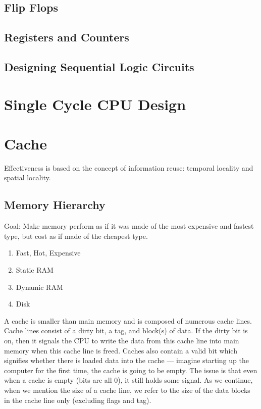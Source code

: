 \documentclass[11pt]{article}
\begin{document}
\subsection{Flip Flops}

\subsection{Registers and Counters}

\subsection{Designing Sequential Logic Circuits}

\section{Single Cycle CPU Design}

\section{Cache}

Effectiveness is based on the concept of information reuse: temporal locality and spatial locality.

\subsection{Memory Hierarchy}

Goal: Make memory perform as if it was made of the most expensive and fastest type, but cost as if made of the cheapest type.

\begin{enumerate}
	\item Fast, Hot, Expensive
	\item Static RAM
	\item Dynamic RAM
	\item Disk
\end{enumerate}

\noindent A cache is smaller than main memory and is composed of numerous cache lines. Cache lines consist of a dirty bit, a tag, and block(s) of data. If the dirty bit is on, then it signals the CPU to write the data from this cache line into main memory when this cache line is freed. Caches also contain a valid bit which signifies whether there is loaded data into the cache --- imagine starting up the computer for the first time, the cache is going to be empty. The issue is that even when a cache is empty (bits are all 0), it still holds some signal. As we continue, when we mention the size of a cache line, we refer to the size of the data blocks in the cache line only (excluding flags and tag).
\end{document}
